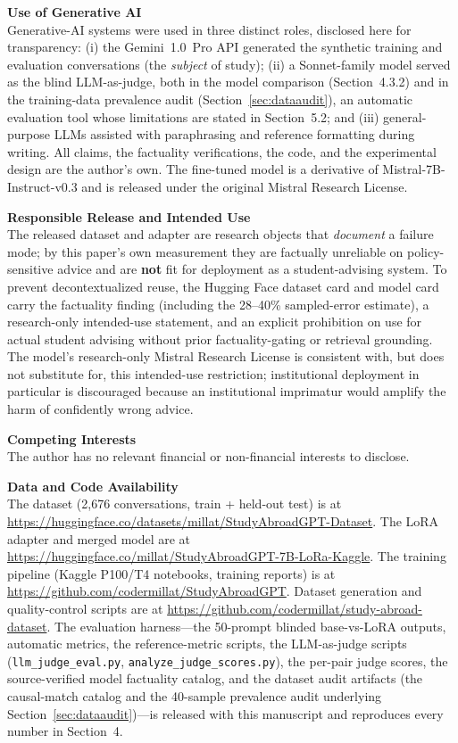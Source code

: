 \documentclass[11pt, a4paper]{article}
\begin{document}
\textbf{Use of Generative AI} \\
Generative-AI systems were used in three distinct roles, disclosed here for transparency: (i) the Gemini~1.0~Pro API generated the synthetic training and evaluation conversations (the \emph{subject} of study); (ii) a Sonnet-family model served as the blind LLM-as-judge, both in the model comparison (Section~4.3.2) and in the training-data prevalence audit (Section~\ref{sec:dataaudit}), an automatic evaluation tool whose limitations are stated in Section~5.2; and (iii) general-purpose LLMs assisted with paraphrasing and reference formatting during writing. All claims, the factuality verifications, the code, and the experimental design are the author's own. The fine-tuned model is a derivative of Mistral-7B-Instruct-v0.3 and is released under the original Mistral Research License.

\textbf{Responsible Release and Intended Use} \\
The released dataset and adapter are research objects that \emph{document} a failure mode; by this paper's own measurement they are factually unreliable on policy-sensitive advice and are \textbf{not} fit for deployment as a student-advising system. To prevent decontextualized reuse, the Hugging Face dataset card and model card carry the factuality finding (including the 28--40\% sampled-error estimate), a research-only intended-use statement, and an explicit prohibition on use for actual student advising without prior factuality-gating or retrieval grounding. The model's research-only Mistral Research License is consistent with, but does not substitute for, this intended-use restriction; institutional deployment in particular is discouraged because an institutional imprimatur would amplify the harm of confidently wrong advice.

\textbf{Competing Interests} \\
The author has no relevant financial or non-financial interests to disclose.

\textbf{Data and Code Availability} \\
The dataset (2{,}676 conversations, train + held-out test) is at \url{https://huggingface.co/datasets/millat/StudyAbroadGPT-Dataset}. The LoRA adapter and merged model are at \url{https://huggingface.co/millat/StudyAbroadGPT-7B-LoRa-Kaggle}. The training pipeline (Kaggle P100/T4 notebooks, training reports) is at \url{https://github.com/codermillat/StudyAbroadGPT}. Dataset generation and quality-control scripts are at \url{https://github.com/codermillat/study-abroad-dataset}. The evaluation harness---the 50-prompt blinded base-vs-LoRA outputs, automatic metrics, the reference-metric scripts, the LLM-as-judge scripts (\texttt{llm\_judge\_eval.py}, \texttt{analyze\_judge\_scores.py}), the per-pair judge scores, the source-verified model factuality catalog, and the dataset audit artifacts (the causal-match catalog and the 40-sample prevalence audit underlying Section~\ref{sec:dataaudit})---is released with this manuscript and reproduces every number in Section~4.
\end{document}
